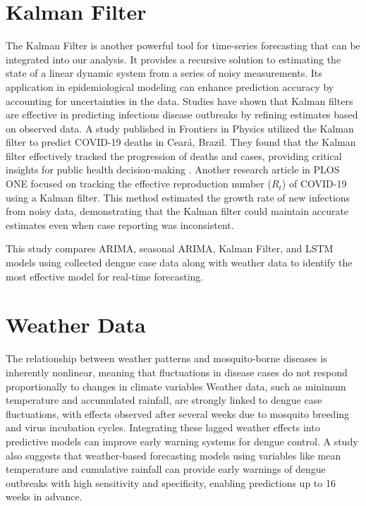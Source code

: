 \section{Kalman Filter}
The Kalman Filter is another powerful tool for time-series forecasting that can be integrated into our analysis. It provides a recursive solution to estimating the state of a linear dynamic system from a series of noisy measurements. Its application in epidemiological modeling can enhance prediction accuracy by accounting for uncertainties in the data\cite{li2022applications}. Studies have shown that Kalman filters are effective in predicting infectious disease outbreaks by refining estimates based on observed data. A study published in Frontiers in Physics utilized the Kalman filter to predict COVID-19 deaths in Ceará, Brazil. They found that the Kalman filter effectively tracked the progression of deaths and cases, providing critical insights for public health decision-making \cite{ahmadini2021analysis}. Another research article in PLOS ONE focused on tracking the effective reproduction number ($R_t$) of COVID-19 using a Kalman filter. This method estimated the growth rate of new infections from noisy data, demonstrating that the Kalman filter could maintain accurate estimates even when case reporting was inconsistent\cite{arroyo2021tracking}.

This study compares ARIMA, seasonal ARIMA, Kalman Filter, and LSTM models using collected dengue case data along with weather data to identify the most effective model for real-time forecasting.

\section{Weather Data}
The relationship between weather patterns and mosquito-borne diseases is inherently nonlinear, meaning that fluctuations in disease cases do not respond proportionally to changes in climate variables\cite{colon2013effects} Weather data, such as minimum temperature and accumulated rainfall, are strongly linked to dengue case fluctuations, with effects observed after several weeks due to mosquito breeding and virus incubation cycles. Integrating these lagged weather effects into predictive models can improve early warning systems for dengue control\cite{cheong2013assessing}. A study also suggests that weather-based forecasting models using variables like mean temperature and cumulative rainfall can provide early warnings of dengue outbreaks with high sensitivity and specificity, enabling predictions up to 16 weeks in advance\cite{hii2012forecast}.

